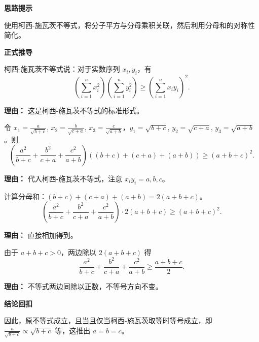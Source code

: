 \begin{proofbox}
\textbf{\textcolor{CProof}{思路提示}}

使用柯西-施瓦茨不等式，将分子平方与分母乘积关联，然后利用分母和的对称性简化。

\medskip
\textbf{\textcolor{CProof}{正式推导}}
\begin{description}[style=nextline, leftmargin=2.8em, labelsep=0.5em, itemsep=0.55em]
    \item[\textbf{步骤一（柯西-施瓦茨形式）：}] 柯西-施瓦茨不等式说：对于实数序列 $x_i, y_i$，有
    \[
    \left( \sum_{i=1}^{n} x_i^2 \right) \left( \sum_{i=1}^{n} y_i^2 \right) \ge \left( \sum_{i=1}^{n} x_i y_i \right)^2.
    \]
    \par\textbf{理由：}
    这是柯西-施瓦茨不等式的标准形式。

    \item[\textbf{步骤二（应用序列）：}] 令 $x_1 = \frac{a}{\sqrt{b+c}}$, $x_2 = \frac{b}{\sqrt{c+a}}$, $x_3 = \frac{c}{\sqrt{a+b}}$，$y_1 = \sqrt{b+c}$, $y_2 = \sqrt{c+a}$, $y_3 = \sqrt{a+b}$。则
    \[
    \left( \frac{a^2}{b+c} + \frac{b^2}{c+a} + \frac{c^2}{a+b} \right) \left( (b+c) + (c+a) + (a+b) \right) \ge (a+b+c)^2.
    \]
    \par\textbf{理由：}
    代入柯西-施瓦茨不等式，注意 $x_i y_i = a, b, c$。

    \item[\textbf{步骤三（计算分母和）：}] 计算分母和：$(b+c)+(c+a)+(a+b) = 2(a+b+c)$。
    \[
    \left( \frac{a^2}{b+c} + \frac{b^2}{c+a} + \frac{c^2}{a+b} \right) \cdot 2(a+b+c) \ge (a+b+c)^2.
    \]
    \par\textbf{理由：}
    直接相加得到。

    \item[\textbf{步骤四（整理不等式）：}] 由于 $a+b+c > 0$，两边除以 $2(a+b+c)$ 得
    \[
    \frac{a^2}{b+c} + \frac{b^2}{c+a} + \frac{c^2}{a+b} \ge \frac{a+b+c}{2}.
    \]
    \par\textbf{理由：}
    不等式两边同除以正数，不等号方向不变。
\end{description}

\medskip
\textbf{\textcolor{CProof}{结论回扣}}

因此，原不等式成立，且当且仅当柯西-施瓦茨取等时等号成立，即 $\frac{a}{\sqrt{b+c}} \propto \sqrt{b+c}$ 等，这推出 $a=b=c$。
\end{proofbox}
